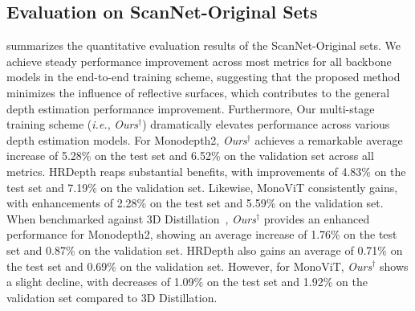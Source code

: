 \subsection{Evaluation on ScanNet-Original Sets}
 summarizes the quantitative evaluation results of the ScanNet-Original sets. 
We achieve steady performance improvement across most metrics for all backbone models in the end-to-end training scheme, suggesting that the proposed method minimizes the influence of reflective surfaces, which contributes to the general depth estimation performance improvement.
Furthermore, Our multi-stage training scheme (\textit{i.e.}, \textit{Ours}$^{\dagger}$) dramatically elevates performance across various depth estimation models. For Monodepth2, \textit{Ours}$^{\dagger}$ achieves a remarkable average increase of 5.28\% on the test set and 6.52\% on the validation set across all metrics. HRDepth reaps substantial benefits, with improvements of 4.83\% on the test set and 7.19\% on the validation set. Likewise, MonoViT consistently gains, with enhancements of 2.28\% on the test set and 5.59\% on the validation set.
When benchmarked against 3D Distillation~\citep{shi20233d}, \textit{Ours}$^{\dagger}$ provides an enhanced performance for Monodepth2, showing an average increase of 1.76\% on the test set and 0.87\% on the validation set. HRDepth also gains an average of 0.71\% on the test set and 0.69\% on the validation set. However, for MonoViT, \textit{Ours}$^{\dagger}$ shows a slight decline, with decreases of 1.09\% on the test set and 1.92\% on the validation set compared to 3D Distillation.

